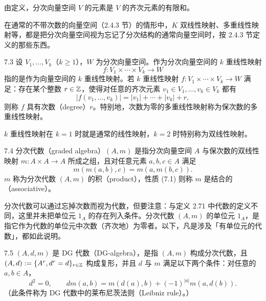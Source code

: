 由定义，分次向量空间 $V$ 的元素是 $V$ 的齐次元素的有限和。

在通常的不带次数的向量空间（2.4.3 节）的情形中，$K$ 双线性映射、多重线性映射等，都是把分次向量空间视为忘记了分次结构的通常向量空间时，按 2.4.3 节定义的那些东西。

\begin{definition}{7.3}
设 $V_{1},\dots,V_{k}$（$k\ge 1$），$W$ 为分次向量空间。作为分次向量空间的 $k$ 重线性映射
\[
  f\colon V_{1}\times\cdots\times V_{k}\longrightarrow W
\]
指的是作为向量空间的 $k$ 重线性映射。若 $k$ 重线性映射 $f\colon V_{1}\times\cdots\times V_{k}\to W$ 满足：存在某个整数 $r\in\mathbb{Z}$，使得对任意的齐次元素 $v_{1}\in V_{1},\dots,v_{k}\in V_{k}$ 都有
\[
  |f(v_{1},\dots,v_{k})|=|v_{1}|+\cdots+|v_{k}|+r,
\]
则称 $f$ 具有次数（degree）$r$。特别地，次数为零的多重线性映射称为保次数的多重线性映射。
\end{definition}


$k$ 重线性映射在 $k=1$ 时就是通常的线性映射，$k=2$ 时特别称为双线性映射。

\begin{definition}{7.4}
分次代数（graded algebra）$(A,m)$ 是指分次向量空间 $A$ 与保次数的双线性映射 $m\colon A\times A\to A$ 所成之组，且对任意元素 $a,b,c\in A$ 满足
\begin{equation}
  m(m(a,b),c)=m(a,m(b,c)). \tag{7.1}
\end{equation}
$m$ 称为分次代数 $(A,m)$ 的积（product），性质 (7.1) 则称 $m$ 是结合的（associative）。
\end{definition}

分次代数可以通过忘掉次数而视为代数，但要注意：与定义 2.71 中代数的定义不同，这里并未把单位元 $1_{A}$ 的存在列入条件。分次代数 $(A,m)$ 的单位元 $1_{A}$，是指它作为代数的单位元中次数（齐次地）为零者。以下，凡是涉及「有单位元的代数」，都如此说明。

\begin{definition}{7.5}
$(A,d,m)$ 是 DG 代数（DG-algebra），是指 $(A,m)$ 构成分次代数，且 $(A,d):=\{A^{r},d^{r}=d\}_{r\in\mathbb{Z}}$ 构成复形，并且 $d$ 与 $m$ 满足以下两个条件：对任意的 $a,b\in A$，
\[
  d^{2}=0,\qquad d m(a,b)=m(d(a),b)+(-1)^{|a|}m(a,d(b)).
\]
（此条件称为 DG 代数中的莱布尼茨法则（Leibniz rule）。）
\end{definition}


